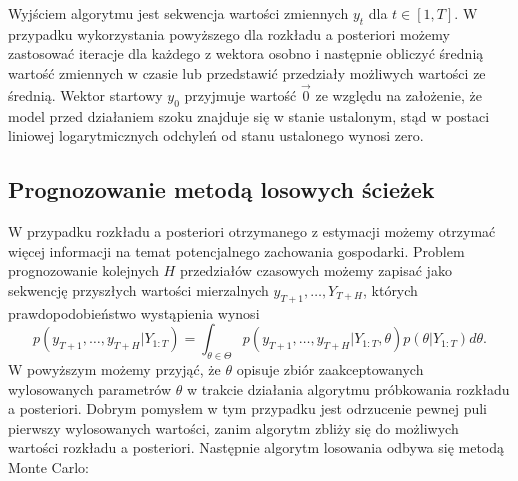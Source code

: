 Wyjściem algorytmu jest sekwencja wartości zmiennych $y_t$ dla $t \in [1,T]$. W przypadku wykorzystania powyższego dla rozkładu a posteriori możemy zastosować iteracje dla każdego z wektora osobno i następnie obliczyć średnią wartość zmiennych w czasie lub przedstawić przedziały możliwych wartości ze średnią. Wektor startowy $y_0$ przyjmuje wartość $\vec{0}$ ze względu na założenie, że model przed działaniem szoku znajduje się w stanie ustalonym, stąd w postaci liniowej logarytmicznych odchyleń od stanu ustalonego wynosi zero.

\subsection{Prognozowanie metodą losowych ścieżek}

W przypadku rozkładu a posteriori otrzymanego z estymacji możemy otrzymać więcej informacji na temat potencjalnego zachowania gospodarki. Problem prognozowanie kolejnych $H$ przedziałów czasowych możemy zapisać jako sekwencję przyszłych wartości mierzalnych $y_{T+1},\dots,Y_{T+H}$, których prawdopodobieństwo wystąpienia wynosi
\begin{equation}
    \label{eqn:predDensity}
    p(y_{T+1}, \dots, y_{T+H}|Y_{1:T}) = \int_{\theta \in \Theta} p(y_{T+1}, \dots, y_{T+H}|Y_{1:T}, \theta) p(\theta|Y_{1:T})d\theta.
\end{equation}
W powyższym możemy przyjąć, że $\theta$ opisuje zbiór zaakceptowanych wylosowanych parametrów $\theta$ w trakcie działania algorytmu próbkowania rozkładu a posteriori. Dobrym pomysłem w tym przypadku jest odrzucenie pewnej puli pierwszy wylosowanych wartości, zanim algorytm zbliży się do możliwych wartości rozkładu a posteriori. Następnie algorytm losowania odbywa się metodą Monte Carlo:
